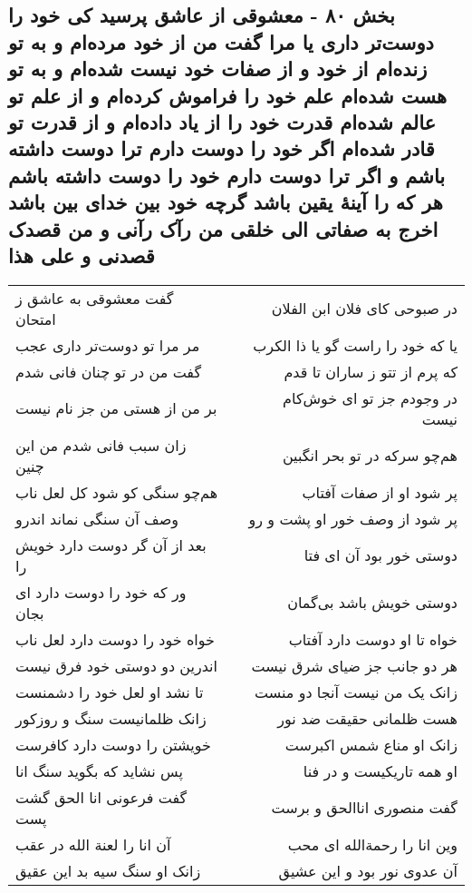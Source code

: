 \begin{center}
\section*{بخش ۸۰ - معشوقی از عاشق پرسید کی خود را دوست‌تر داری یا مرا  گفت من از خود مرده‌ام و به تو زنده‌ام از خود و از صفات خود نیست  شده‌ام و به تو هست شده‌ام علم خود را فراموش کرده‌ام و از علم تو  عالم شده‌ام قدرت خود را از یاد داده‌ام و از قدرت تو قادر شده‌ام اگر خود را دوست دارم ترا دوست داشته باشم و اگر ترا دوست دارم  خود را دوست داشته باشم  هر که را آینهٔ یقین باشد  گرچه خود بین خدای بین باشد  اخرج به صفاتی الی خلقی من رآک رآنی و من قصدک قصدنی و علی هذا}
\label{sec:sh080}
\begin{longtable}{l p{0.5cm} r}
گفت معشوقی به عاشق ز امتحان
&&
در صبوحی کای فلان ابن الفلان
\\
مر مرا تو دوست‌تر داری عجب
&&
یا که خود را راست گو یا ذا الکرب
\\
گفت من در تو چنان فانی شدم
&&
که پرم از تتو ز ساران تا قدم
\\
بر من از هستی من جز نام نیست
&&
در وجودم جز تو ای خوش‌کام نیست
\\
زان سبب فانی شدم من این چنین
&&
هم‌چو سرکه در تو بحر انگبین
\\
هم‌چو سنگی کو شود کل لعل ناب
&&
پر شود او از صفات آفتاب
\\
وصف آن سنگی نماند اندرو
&&
پر شود از وصف خور او پشت و رو
\\
بعد از آن گر دوست دارد خویش را
&&
دوستی خور بود آن ای فتا
\\
ور که خود را دوست دارد ای بجان
&&
دوستی خویش باشد بی‌گمان
\\
خواه خود را دوست دارد لعل ناب
&&
خواه تا او دوست دارد آفتاب
\\
اندرین دو دوستی خود فرق نیست
&&
هر دو جانب جز ضیای شرق نیست
\\
تا نشد او لعل خود را دشمنست
&&
زانک یک من نیست آنجا دو منست
\\
زانک ظلمانیست سنگ و روزکور
&&
هست ظلمانی حقیقت ضد نور
\\
خویشتن را دوست دارد کافرست
&&
زانک او مناع شمس اکبرست
\\
پس نشاید که بگوید سنگ انا
&&
او همه تاریکیست و در فنا
\\
گفت فرعونی انا الحق گشت پست
&&
گفت منصوری اناالحق و برست
\\
آن انا را لعنة الله در عقب
&&
وین انا را رحمةالله ای محب
\\
زانک او سنگ سیه بد این عقیق
&&
آن عدوی نور بود و این عشیق

\end{longtable}
\end{center}
